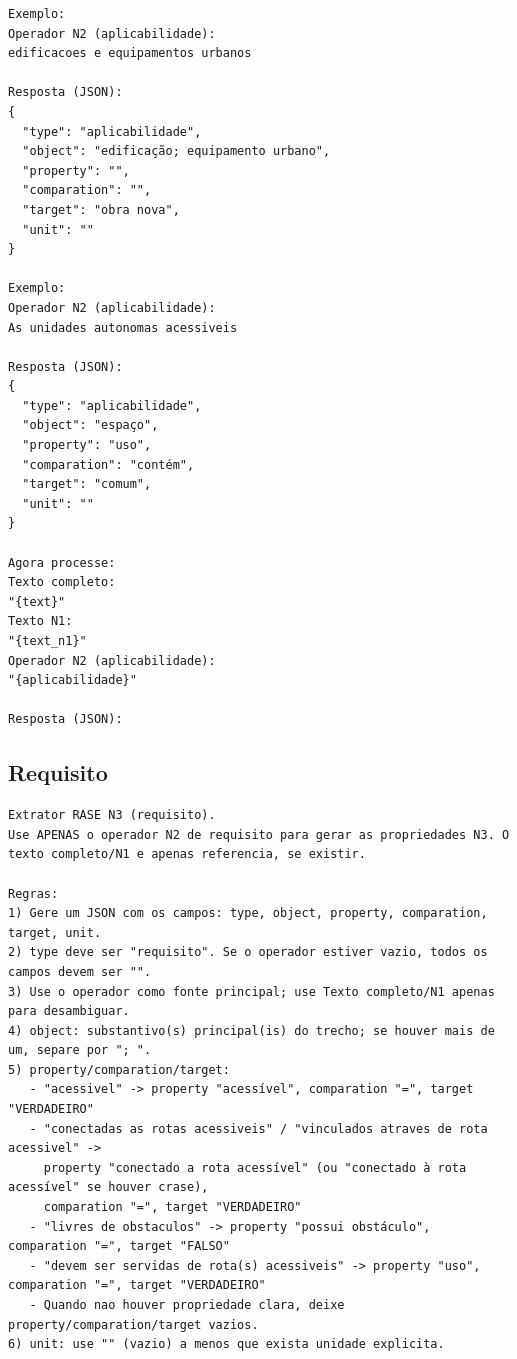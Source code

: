\begin{apendicesenv}
\begin{lstlisting}[caption={\textit{Prompt} do operador Aplicabilidade (N3): \texttt{prompts/n3\_aplicabilidade.txt}.}, label={lst:n3-apl}]
Exemplo:
Operador N2 (aplicabilidade):
edificacoes e equipamentos urbanos

Resposta (JSON):
{
  "type": "aplicabilidade",
  "object": "edificação; equipamento urbano",
  "property": "",
  "comparation": "",
  "target": "obra nova",
  "unit": ""
}

Exemplo:
Operador N2 (aplicabilidade):
As unidades autonomas acessiveis

Resposta (JSON):
{
  "type": "aplicabilidade",
  "object": "espaço",
  "property": "uso",
  "comparation": "contém",
  "target": "comum",
  "unit": ""
}

Agora processe:
Texto completo:
"{text}"
Texto N1:
"{text_n1}"
Operador N2 (aplicabilidade):
"{aplicabilidade}"

Resposta (JSON):
\end{lstlisting}

\subsection{Requisito}

\begin{lstlisting}[caption={\textit{Prompt} do operador Requisito (N3): \texttt{prompts/n3\_requisito.txt}.}, label={lst:n3-req}]
Extrator RASE N3 (requisito).
Use APENAS o operador N2 de requisito para gerar as propriedades N3. O texto completo/N1 e apenas referencia, se existir.

Regras:
1) Gere um JSON com os campos: type, object, property, comparation, target, unit.
2) type deve ser "requisito". Se o operador estiver vazio, todos os campos devem ser "".
3) Use o operador como fonte principal; use Texto completo/N1 apenas para desambiguar.
4) object: substantivo(s) principal(is) do trecho; se houver mais de um, separe por "; ".
5) property/comparation/target:
   - "acessivel" -> property "acessível", comparation "=", target "VERDADEIRO"
   - "conectadas as rotas acessiveis" / "vinculados atraves de rota acessivel" ->
     property "conectado a rota acessível" (ou "conectado à rota acessível" se houver crase),
     comparation "=", target "VERDADEIRO"
   - "livres de obstaculos" -> property "possui obstáculo", comparation "=", target "FALSO"
   - "devem ser servidas de rota(s) acessiveis" -> property "uso", comparation "=", target "VERDADEIRO"
   - Quando nao houver propriedade clara, deixe property/comparation/target vazios.
6) unit: use "" (vazio) a menos que exista unidade explicita.


\end{lstlisting}
\end{apendicesenv}
